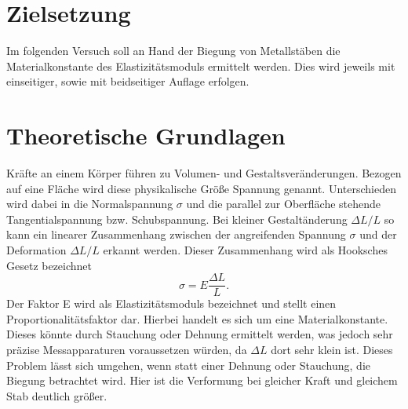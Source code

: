 \section{Zielsetzung}
Im folgenden Versuch soll an Hand der Biegung von Metallstäben die Materialkonstante des Elastizitätsmoduls ermittelt werden. Dies wird jeweils mit einseitiger, sowie mit beidseitiger Auflage erfolgen.
\section{Theoretische Grundlagen}
Kräfte an einem Körper führen zu Volumen- und Gestaltsveränderungen. Bezogen auf eine Fläche wird diese physikalische Größe Spannung genannt. Unterschieden wird dabei in die Normalspannung $\sigma$ und die parallel zur Oberfläche stehende Tangentialspannung bzw. Schubspannung. Bei kleiner Gestaltänderung $\Delta L/L$ so kann ein linearer Zusammenhang zwischen der angreifenden Spannung $\sigma$ und der Deformation $\Delta L/L$ erkannt werden. Dieser Zusammenhang wird als Hooksches Gesetz bezeichnet
\begin{equation}
    \sigma=E\frac{\Delta L}{L}.
\end{equation}
Der Faktor E wird als Elastizitätsmoduls bezeichnet und stellt einen Proportionalitätsfaktor dar. Hierbei handelt es sich um eine Materialkonstante. Dieses könnte durch Stauchung oder Dehnung ermittelt werden, was jedoch sehr präzise Messapparaturen voraussetzen würden, da $\Delta L$ dort sehr klein ist. Dieses Problem lässt sich umgehen, wenn statt einer Dehnung oder Stauchung, die Biegung betrachtet wird. Hier ist die Verformung bei gleicher Kraft und gleichem Stab deutlich größer.
